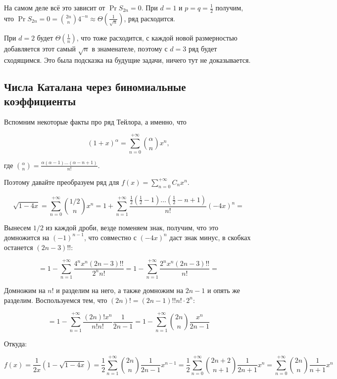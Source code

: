 На самом деле всё это зависит от $\Pr{S_{2n} = 0}$. При $d = 1$ и $p = q = \frac{1}{2}$
получим, что $\Pr{S_{2n} = 0} = \binom{2n}{n}4^{-n} \approx \Theta\left(\frac{1}{\sqrt{n}}\right)$, ряд расходится.

При $d = 2$ будет $\Theta\left(\frac{1}{n}\right)$, что тоже расходится, с каждой
новой размерностью добавляется этот самый $\sqrt{n}$ в знаменателе, поэтому
с $d = 3$ ряд будет сходящимся. Это была подсказка на будущие задачи, ничего
тут не доказывается.

\subsection{Числа Каталана через биномиальные коэффициенты}
Вспомним некоторые факты про ряд Тейлора, а именно, что

\[
  (1 + x)^{\alpha} = \sum\limits_{n = 0}^{+\infty} \binom{\alpha}{n}x^n,
\]

где $\binom{\alpha}{n} = \frac{\alpha(\alpha - 1)\ldots (\alpha - n + 1)}{n!}$.

Поэтому давайте преобразуем ряд для $f(x) = \sum\limits_{n = 0}^{+\infty} C_n x^n$.

\[
  \sqrt{1 - 4x} = \sum\limits_{n = 0}^{+\infty} \binom{1/2}{n}x^n = 
  1 + \sum\limits_{n = 1}^{+\infty} \frac{\frac{1}{2}\left(\frac{1}{2} - 1\right)
  \ldots\left(\frac{1}{2} - n + 1\right)}{n!}(-4x)^n = 
\]

Вынесем $1/2$ из каждой дроби, везде поменяем знак, получим, что это домножится
на $(-1)^{n - 1}$, что совместно с $(-4x)^n$ даст знак минус, в скобках
останется $(2n - 3)!!$:

\[
  = 1 - \sum\limits_{n = 1}^{+\infty} \frac{4^n x^n (2n - 3)!!}{2^n n!} =
  1 - \sum\limits_{n = 1}^{+\infty} \frac{2^n x^n (2n - 3)!!}{n!} = 
\]

Домножим на $n!$ и разделим на него, а также домножим на $2n - 1$ и опять же
разделим. Воспользуемся тем, что $(2n)! = (2n - 1)!! n! \cdot 2^n$:

\[
  = 1 - \sum\limits_{n = 1}^{+\infty} \frac{(2n)!x^n}{n!n!}\frac{1}{2n - 1} =
  1 - \sum\limits_{n = 1}^{+\infty} \binom{2n}{n} \frac{x^n}{2n - 1}
\]

Откуда:

\[
  f(x) = \frac{1}{2x}(1 - \sqrt{1 - 4x}) = \frac{1}{2}\sum\limits_{n = 1}^{+\infty}
  \binom{2n}{n} \frac{1}{2n - 1}x^{n - 1} = 
  \frac{1}{2}\sum\limits_{n = 0}^{+\infty} \binom{2n + 2}{n + 1} \frac{1}{2n + 1}x^{n} =
  \sum\limits_{n = 0}^{+\infty} \binom{2n}{n} \frac{1}{n + 1}x^{n}
\]

